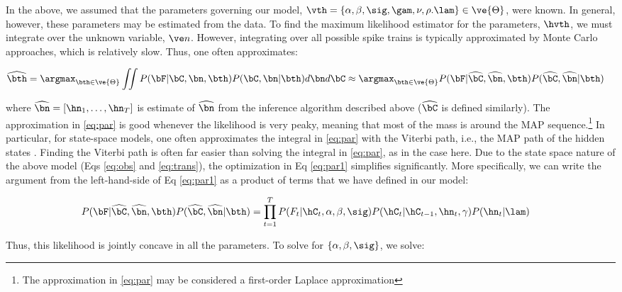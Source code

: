 In the above, we assumed that the parameters governing our model, $\vth=\{\alpha, \beta, \sig, \gam, \nu, \rho. \lam\} \in \ve{\Theta}$,  %
were known. In general, however, these parameters may be estimated from the data. To find the maximum likelihood estimator for the parameters, $\hvth$, we must integrate over the unknown variable, $\zT$. However, integrating over all possible spike trains is typically approximated by Monte Carlo approaches, which is relatively slow. Thus, one often approximates: %

\begin{align} \label{eq:par1}
\widehat{\bth} &= \argmax_{\bth \in \ve{\Theta}} \iint P(\bF|\bC, \bn, \bth) P(\bC, \bn | \bth) d\bn d\bC  \approx \argmax_{\bth \in \ve{\Theta}}P(\bF| \hCm, \hnm, \bth) P(\hCm, \hnm | \bth)
\end{align}

\noindent where $\hnm=[\hn_1, \ldots, \hn_T]$ is estimate of $\hnm$ from the inference algorithm described above ($\hCm$ is defined similarly). The approximation in \eqref{eq:par} is good whenever the likelihood is very peaky, meaning that most of the mass is around the MAP sequence.\footnote{The approximation in \eqref{eq:par} may be considered a first-order Laplace approximation}  In particular, for state-space models, one often approximates the integral in \eqref{eq:par} with the Viterbi path, i.e., the MAP path of the hidden states \cite{Rabiner89}. Finding the Viterbi path is often far easier than solving the integral in \eqref{eq:par}, as in the case here.  Due to the state space nature of the above model (Eqs \eqref{eq:obs} and \eqref{eq:trans}), the optimization in Eq \eqref{eq:par1} simplifies significantly.  More specifically, we can write the argument from the left-hand-side of Eq \eqref{eq:par1} as a product of terms that we have defined in our model:

 \begin{align} \label{eq:par2}
P(\bF| \hCm, \hnm, \bth) P(\hCm, \hnm | \bth) &= \prod_{t=1}^T P(F_t | \hC_t, \alpha, \beta,\sig) P(\hC_t | \hC_{t-1}, \hn_t, \gamma) P(\hn_t | \lam)
\end{align}

\noindent Thus, this likelihood is jointly concave in all the parameters.  To solve for $\{\alpha,\beta,\sig\}$, we solve:

